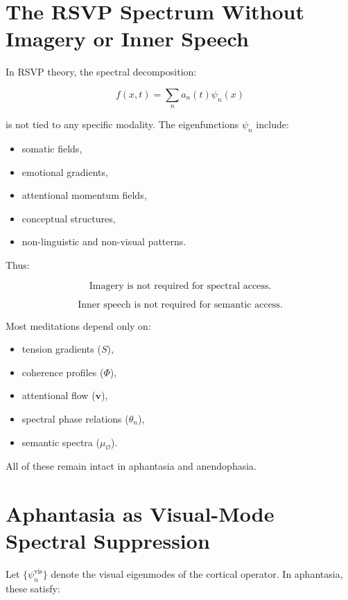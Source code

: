 \documentclass[12pt]{article}
\begin{document}
\section{The RSVP Spectrum Without Imagery or Inner Speech}

In RSVP theory, the spectral decomposition:

\[
f(x,t)=\sum_{n} a_n(t)\psi_n(x)
\]

is not tied to any specific modality.  
The eigenfunctions $\psi_n$ include:

\begin{itemize}
    \item somatic fields,
    \item emotional gradients,
    \item attentional momentum fields,
    \item conceptual structures,
    \item non-linguistic and non-visual patterns.
\end{itemize}

Thus:

\[
\text{Imagery is not required for spectral access.} 
\]

\[
\text{Inner speech is not required for semantic access.}
\]

Most meditations depend only on:

\begin{itemize}
    \item tension gradients ($S$),
    \item coherence profiles ($\Phi$),
    \item attentional flow ($\mathbf{v}$),
    \item spectral phase relations ($\theta_n$),
    \item semantic spectra ($\mu_{\mathcal O}$).
\end{itemize}

All of these remain intact in aphantasia and anendophasia.

\section{Aphantasia as Visual-Mode Spectral Suppression}

Let $\{\psi_n^{\text{vis}}\}$ denote the visual eigenmodes of the cortical operator.
In aphantasia, these satisfy:
\end{document}
